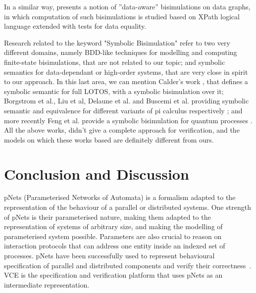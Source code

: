 \documentclass{lmcs}
\begin{document}
In a similar way, \cite{Abriola:2018} presents a notion of ''data-aware'' bisimulations on data graphs, in which computation of such bisimulations is studied based on XPath logical language extended with tests for data equality.


Research related to the keyword "Symbolic Bisimulation" refer to two very different domains, namely BDD-like techniques for modelling and computing finite-state bisimulations, that are not related to our topic; and symbolic semantics for data-dependant or high-order systems, that are very close in spirit to our approach. In this last area, we can mention
Calder's work \cite{calder2001symbolic}, that  defines a symbolic semantic for full LOTOS, with a symbolic bisimulation over it;
Borgstrom et al., Liu et al, Delaune et al. and Buscemi et al. providing symbolic semantic and equivalence for different variants of pi calculus respectively \cite{borgstrom2004symbolic,delaune2007symbolic,liu2010complete,buscemi2008open}; and more recently
 Feng et al. provide a symbolic bisimulation for quantum processes \cite{feng2014symbolic}.
All the above works, didn't give a complete approach for verification, and the models on which these works based are definitely different from ours.



\section{Conclusion and Discussion}
\label{section:conclusion}
 pNets (Parameterised Networks of Automata) is a formalism adapted to the representation of the behaviour of a parallel or distributed systems. One  strength of pNets is their parameterised nature, making them adapted to the representation of systems of arbitrary size, and making the modelling of parameterised system possible. Parameters are also crucial to reason on interaction protocols that can address one entity inside an indexed set of processes. pNets have been successfully used to represent behavioural specification of parallel and distributed components and verify their correctness~\cite{AmeurBoulifa2017,HKM-FASE16}. VCE is the specification and verification platform that uses pNets as an intermediate representation.
\end{document}
